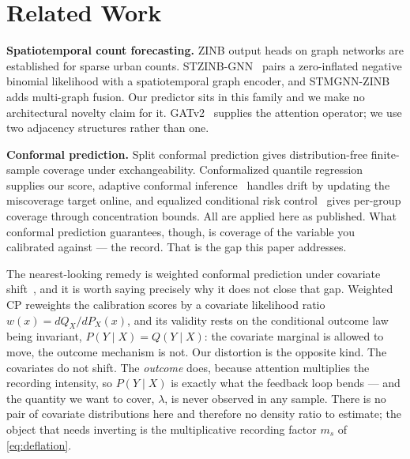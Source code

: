 \documentclass[journal,10pt,twocolumn]{IEEEtran}
\begin{document}
\section{Related Work}
\textbf{Spatiotemporal count forecasting.} ZINB output heads on graph networks
are established for sparse urban counts. STZINB-GNN~\cite{zhuang2022uncertainty}
pairs a zero-inflated negative binomial likelihood with a spatiotemporal graph
encoder, and STMGNN-ZINB~\cite{wang2024spatiotemporal} adds multi-graph fusion.
Our predictor sits in this family and we make no architectural novelty claim for
it. GATv2~\cite{brody2022attentive} supplies the attention operator; we use two
adjacency structures rather than one.

\textbf{Conformal prediction.} Split conformal prediction gives
distribution-free finite-sample coverage under exchangeability. Conformalized
quantile regression~\cite{romano2019conformalized} supplies our score, adaptive
conformal inference~\cite{gibbs2021adaptive} handles drift by updating the
miscoverage target online, and equalized conditional risk
control~\cite{feldman2021improving} gives per-group coverage through
concentration bounds. All are applied here as published. What conformal
prediction guarantees, though, is coverage of the variable you calibrated
against --- the record. That is the gap this paper addresses.

The nearest-looking remedy is weighted conformal prediction under covariate
shift~\cite{tibshirani2019conformal}, and it is worth saying precisely why it does
not close that gap. Weighted CP reweights the calibration scores by a covariate
likelihood ratio $w(x) = dQ_X/dP_X(x)$, and its validity rests on the conditional
outcome law being invariant, $P(Y \mid X) = Q(Y \mid X)$: the covariate marginal
is allowed to move, the outcome mechanism is not. Our distortion is the opposite
kind. The covariates do not shift. The \emph{outcome} does, because attention
multiplies the recording intensity, so $P(Y \mid X)$ is exactly what the feedback
loop bends --- and the quantity we want to cover, $\lambda$, is never observed in
any sample. There is no pair of covariate distributions here and therefore no
density ratio to estimate; the object that needs inverting is the multiplicative
recording factor $m_s$ of \eqref{eq:deflation}.
\end{document}
